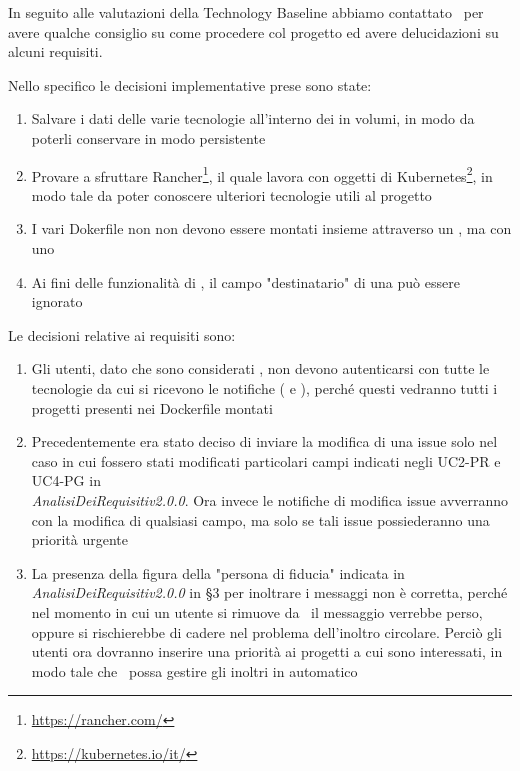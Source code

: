     In seguito alle valutazioni della Technology Baseline abbiamo contattato \DZ\ per avere qualche consiglio su come procedere col progetto ed avere delucidazioni su alcuni requisiti.

    Nello specifico le decisioni implementative prese sono state:
    \begin{enumerate}
        \item Salvare i dati delle varie tecnologie all'interno dei  in volumi, in modo da poterli conservare in modo persistente
        \item Provare a sfruttare Rancher\footnote{\url{https://rancher.com/}}, il quale lavora con oggetti di Kubernetes\footnote{\url{https://kubernetes.io/it/}}, in modo tale da poter conoscere ulteriori tecnologie utili al progetto
        \item I vari Dokerfile non non devono essere montati insieme attraverso un , ma con uno 
        \item Ai fini delle funzionalità di \progetto, il campo "destinatario" di una  può essere ignorato
    \end{enumerate}

    Le decisioni relative ai requisiti sono:
    \begin{enumerate}
        \item Gli utenti, dato che sono considerati , non devono autenticarsi con tutte le tecnologie da cui si ricevono le notifiche ( e ), perché questi vedranno tutti i progetti presenti nei Dockerfile montati
        \item Precedentemente era stato deciso di inviare la modifica di una issue solo nel caso in cui fossero stati modificati particolari campi indicati negli UC2-PR e UC4-PG in\\ \textit{AnalisiDeiRequisitiv2.0.0}. Ora invece le notifiche di modifica issue avverranno con la modifica di qualsiasi campo, ma solo se tali issue possiederanno una priorità urgente
        \item La presenza della figura della "persona di fiducia" indicata in \textit{AnalisiDeiRequisitiv2.0.0} in §3 per inoltrare i messaggi non è corretta, perché nel momento in cui un utente si rimuove da \progetto\ il messaggio verrebbe perso, oppure si rischierebbe di cadere nel problema dell'inoltro circolare. Perciò gli utenti ora dovranno inserire una priorità ai progetti a cui sono interessati, in modo tale che \progetto\ possa gestire gli inoltri in automatico
    \end{enumerate}

